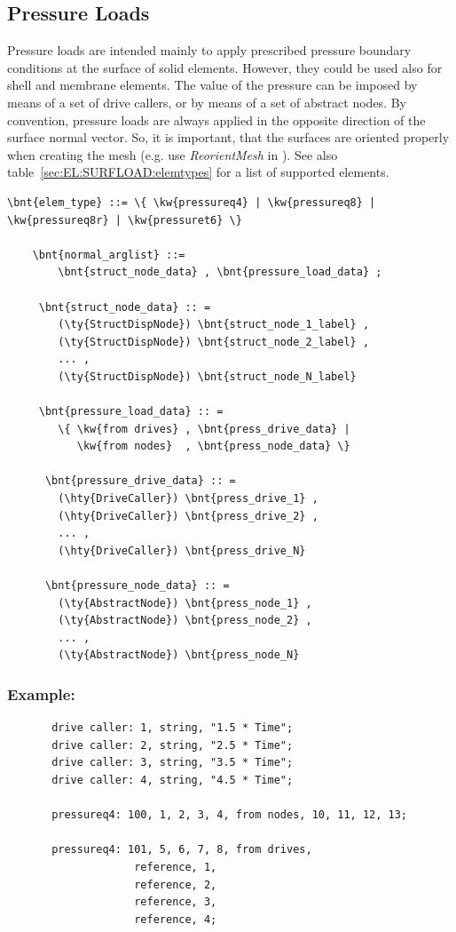 \subsection{Pressure Loads}
Pressure loads are intended mainly to apply prescribed pressure boundary conditions at the surface of solid elements.
However, they could be used also for shell and membrane elements. The value of the pressure can be imposed
by means of a set of drive callers, or by means of a set of abstract nodes. By convention, pressure loads are always applied
in the opposite direction of the surface normal vector. So, it is important, that the surfaces are oriented properly
when creating the mesh (e.g. use \emph{ReorientMesh} in ).
See also table~\ref{sec:EL:SURFLOAD:elemtypes} for a list of supported elements.
\begin{Verbatim}[commandchars=\\\{\}]
  \bnt{elem_type} ::= \{ \kw{pressureq4} | \kw{pressureq8} | \kw{pressureq8r} | \kw{pressuret6} \}

    \bnt{normal_arglist} ::=
        \bnt{struct_node_data} , \bnt{pressure_load_data} ;

     \bnt{struct_node_data} :: =
        (\ty{StructDispNode}) \bnt{struct_node_1_label} ,
        (\ty{StructDispNode}) \bnt{struct_node_2_label} ,
        ... ,
        (\ty{StructDispNode}) \bnt{struct_node_N_label}

     \bnt{pressure_load_data} :: =
        \{ \kw{from drives} , \bnt{press_drive_data} |
           \kw{from nodes}  , \bnt{press_node_data} \}

      \bnt{pressure_drive_data} :: =
        (\hty{DriveCaller}) \bnt{press_drive_1} ,
        (\hty{DriveCaller}) \bnt{press_drive_2} ,
        ... ,
        (\hty{DriveCaller}) \bnt{press_drive_N}

      \bnt{pressure_node_data} :: =
        (\ty{AbstractNode}) \bnt{press_node_1} ,
        (\ty{AbstractNode}) \bnt{press_node_2} ,
        ... ,
        (\ty{AbstractNode}) \bnt{press_node_N}

\end{Verbatim}

\subsubsection{Example:}
\begin{verbatim}
       drive caller: 1, string, "1.5 * Time";
       drive caller: 2, string, "2.5 * Time";
       drive caller: 3, string, "3.5 * Time";
       drive caller: 4, string, "4.5 * Time";

       pressureq4: 100, 1, 2, 3, 4, from nodes, 10, 11, 12, 13;

       pressureq4: 101, 5, 6, 7, 8, from drives,
                    reference, 1,
                    reference, 2,
                    reference, 3,
                    reference, 4;
\end{verbatim}

